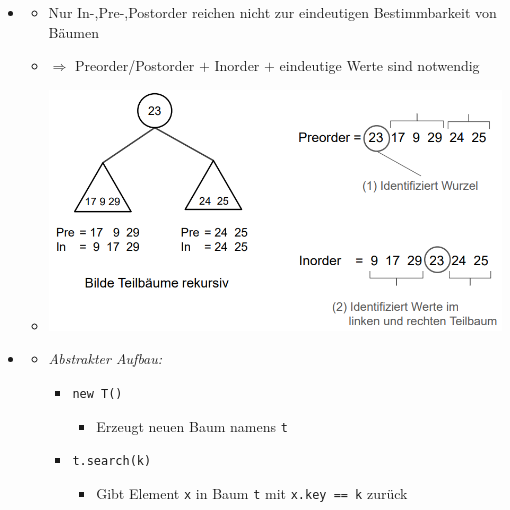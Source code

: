 \documentclass[
    12pt,
    a4paper,
    ngerman,
    color=3b,%
    marginpar=false,
    colorback=false,
    leqno,
]{tudaexercise}
\begin{document}
\begin{itemize}
\begin{itemize}
\begin{minipage}[t]{0.31\textwidth}
                    \end{minipage}
          \end{itemize}
          \clearpage
    \item {}
          \begin{itemize}
              \item Nur In-,Pre-,Postorder reichen nicht zur eindeutigen Bestimmbarkeit von Bäumen
              \item[] $\Rightarrow$ Preorder/Postorder $+$ Inorder $+$ eindeutige Werte sind notwendig
              \item[] \includegraphics[width=12cm]{pictures/bestimmbarkeitBaum.PNG}
          \end{itemize}


    \item {}
          \begin{itemize}
              \item \textit{Abstrakter Aufbau:}
                    \begin{itemize}
                        \item \texttt{new T()}
                              \begin{itemize}
                                  \item Erzeugt neuen Baum namens \texttt{t}
                              \end{itemize}

                        \item \texttt{t.search(k)}
                              \begin{itemize}
                                  \item Gibt Element \texttt{x} in Baum \texttt{t} mit \texttt{x.key == k} zurück
                              \end{itemize}


\end{itemize}
\end{itemize}
\end{itemize}
\end{document}

